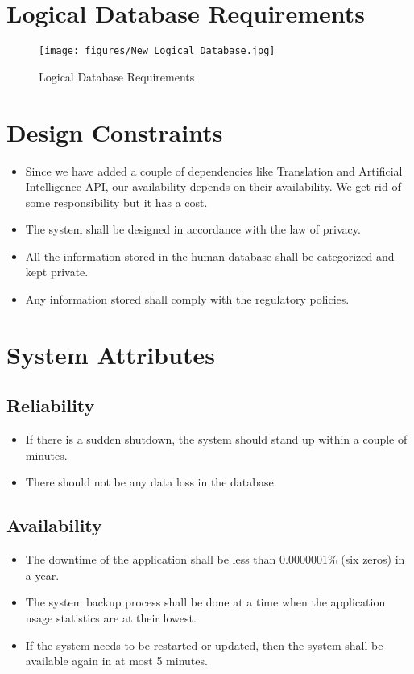\documentclass[listof=nochaptergap]{report}
\begin{document}
\section{Logical Database Requirements}

    \begin{center}
        \begin{figure}[H]
            \centering
            \texttt{[image: figures/New\_Logical\_Database.jpg]}
            \caption{Logical Database Requirements} 
            \label{fig:figure1}
        \end{figure}
    \end{center}


\section{Design Constraints}
\begin{itemize}
    \item Since we have added a couple of dependencies like Translation and Artificial Intelligence API, our availability depends on their availability. We get rid of some responsibility but it has a cost.
    \item The system shall be designed in accordance with the law of privacy.
    \item All the information stored in the human database shall be categorized and kept private.
    \item Any information stored shall comply with the regulatory policies.
\end{itemize}

\section{System Attributes}

\subsection{Reliability}
\begin{itemize}
    \item If there is a sudden shutdown, the system should stand up within a couple of minutes.
    \item There should not be any data loss in the database.
\end{itemize}

\subsection{Availability}
\begin{itemize}
    \item The downtime of the application shall be less than 0.0000001\% (six zeros) in a year.
    \item The system backup process shall be done at a time when the application usage statistics are at their lowest.
    \item If the system needs to be restarted or updated, then the system shall be available again in at most 5 minutes.
\end{itemize}
\end{document}
